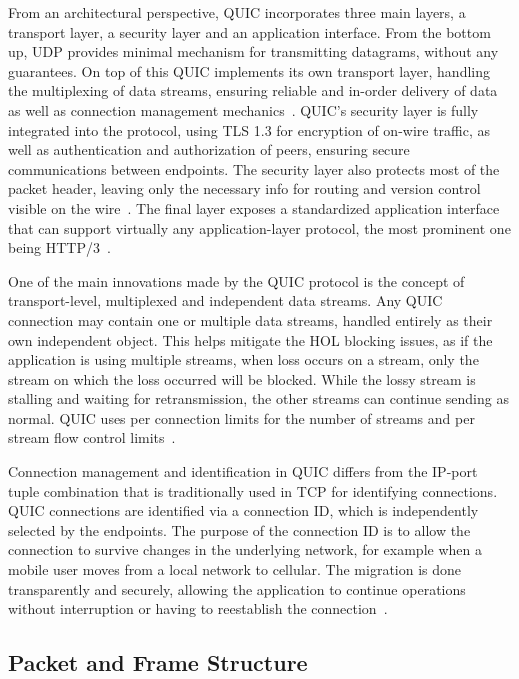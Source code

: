 \documentclass[english, 12pt, a4paper, elec, utf8, a-2b, online]{aaltothesis}
\begin{document}
From an architectural perspective, QUIC incorporates three main layers, a transport
layer, a security layer and an application interface. From the bottom up, UDP provides
minimal mechanism for transmitting datagrams, without any guarantees. On top of this
QUIC implements its own transport layer, handling the multiplexing of data streams,
ensuring reliable and in-order delivery of data as well as connection management
mechanics~\cite{rfc9000}. QUIC's security layer is fully integrated into the protocol, using TLS 1.3
for encryption of on-wire traffic, as well as authentication and authorization of peers, ensuring
secure communications between endpoints. The security layer also protects most of
the packet header, leaving only the necessary info for routing and version control
visible on the wire~\cite{rfc9001}. The final layer exposes a standardized application
interface that can support virtually any application-layer protocol, the most prominent
one being HTTP/3~\cite{rfc9113}.

One of the main innovations made by the QUIC protocol is the concept of transport-level,
multiplexed and independent data streams. Any QUIC connection may contain one or multiple
data streams, handled entirely as their own independent object. This helps mitigate the
HOL blocking issues, as if the application is using multiple streams, when loss occurs on a stream,
only the stream on which the loss occurred will be blocked. While the lossy stream is
stalling and waiting for retransmission, the other streams can continue sending as 
normal. QUIC uses per connection limits for the number of streams and per stream
flow control limits~\cite{rfc9000}.

Connection management and identification in QUIC differs from the IP-port tuple
combination that is traditionally used in TCP for identifying connections. QUIC connections are identified via a
connection ID, which is independently selected by the endpoints. The purpose of the
connection ID is to allow the connection to survive changes in the underlying network, for example
when a mobile user moves from a local network to cellular. The migration is done transparently
and securely, allowing the application to continue operations without interruption or having
to reestablish the connection~\cite{rfc9000}.

\subsection{Packet and Frame Structure}
\end{document}

